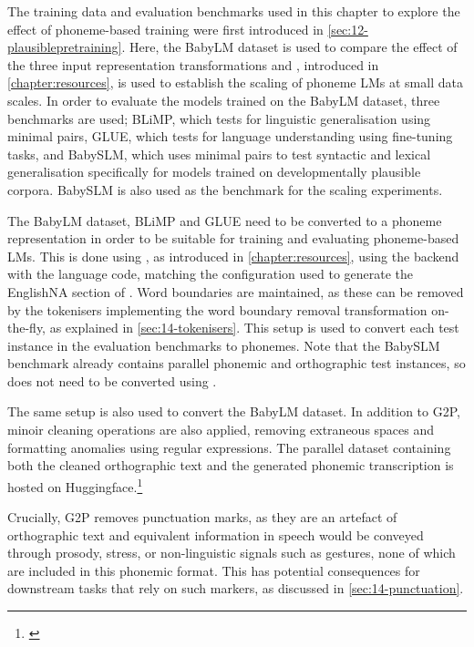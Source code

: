 The training data and evaluation benchmarks used in this chapter to explore the effect of phoneme-based training were first introduced in \cref{sec:12-plausiblepretraining}. Here, the BabyLM dataset is used to compare the effect of the three input representation transformations and \ipachildes, introduced in \cref{chapter:resources}, is used to establish the scaling of phoneme LMs at small data scales. In order to evaluate the models trained on the BabyLM dataset, three benchmarks are used; BLiMP, which tests for linguistic generalisation using minimal pairs, GLUE, which tests for language understanding using fine-tuning tasks, and BabySLM, which uses minimal pairs to test syntactic and lexical generalisation specifically for models trained on developmentally plausible corpora. BabySLM is also used as the benchmark for the scaling experiments.

The BabyLM dataset, BLiMP and GLUE need to be converted to a phoneme representation in order to be suitable for training and evaluating phoneme-based LMs. This is done using \gpp, as introduced in \cref{chapter:resources}, using the \phonemizer backend with the  language code, matching the configuration used to generate the EnglishNA section of \ipachildes. Word boundaries are maintained, as these can be removed by the tokenisers implementing the word boundary removal transformation on-the-fly, as explained in \cref{sec:14-tokenisers}. This setup is used to convert each test instance in the evaluation benchmarks to phonemes. Note that the BabySLM benchmark already contains parallel phonemic and orthographic test instances, so does not need to be converted using \gpp.

The same setup is also used to convert the BabyLM dataset. In addition to G2P, minoir cleaning operations are also applied, removing extraneous spaces and formatting anomalies using regular expressions. The parallel dataset containing both the cleaned orthographic text and the generated phonemic transcription is hosted on Huggingface.\footnote{\href{https://huggingface.co/datasets/phonemetransformers/IPA-BabyLM}{}}

Crucially, G2P removes punctuation marks, as they are an artefact of orthographic text and equivalent information in speech would be conveyed through prosody, stress, or non-linguistic signals such as gestures, none of which are included in this phonemic format. This has potential consequences for downstream tasks that rely on such markers, as discussed in \cref{sec:14-punctuation}.

